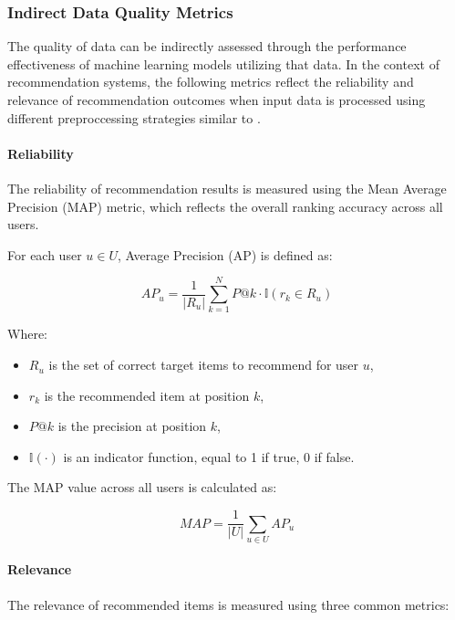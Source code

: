 \documentclass{ieeeaccess}
\begin{document}
\subsubsection{Indirect Data Quality Metrics}

The quality of data can be indirectly assessed through the performance effectiveness of machine learning models utilizing that data. In the context of recommendation systems, the following metrics reflect the reliability and relevance of recommendation outcomes when input data is processed using different preproccessing strategies similar to \cite{nguyen2025data_quality, nguyen2024hbert4rec}.

\paragraph*{Reliability}

The reliability of recommendation results is measured using the Mean Average Precision (MAP) metric, which reflects the overall ranking accuracy across all users.

For each user \( u \in U \), Average Precision (AP) is defined as:

\begin{equation}
AP_u = \frac{1}{|R_u|} \sum_{k=1}^{N} P@k \cdot \mathbb{I}(r_k \in R_u)
\end{equation}

Where:
\begin{itemize}
    \item \( R_u \) is the set of correct target items to recommend for user \( u \),
    \item \( r_k \) is the recommended item at position \( k \),
    \item \( P@k \) is the precision at position \( k \),
    \item \( \mathbb{I}(\cdot) \) is an indicator function, equal to 1 if true, 0 if false.
\end{itemize}

The MAP value across all users is calculated as:

\begin{equation}
MAP = \frac{1}{|U|} \sum_{u \in U} AP_u
\end{equation}

\paragraph*{Relevance}

The relevance of recommended items is measured using three common metrics:
\end{document}
